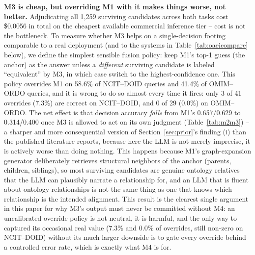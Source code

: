 \documentclass[conference]{IEEEtran}
\begin{document}
\textbf{M3 is cheap, but overriding M1 with it makes things worse, not better.} Adjudicating all 1{,}259 surviving candidates across both tasks cost \$0.0056 in total on the cheapest available commercial inference tier -- cost is not the bottleneck. To measure whether M3 helps on a single-decision footing comparable to a real deployment (and to the systems in Table~\ref{tab:oaeicompare} below), we define the simplest sensible fusion policy: keep M1's top-1 guess (the anchor) as the answer unless a \emph{different} surviving candidate is labeled ``equivalent'' by M3, in which case switch to the highest-confidence one. This policy overrides M1 on 58.6\% of NCIT--DOID queries and 41.4\% of OMIM--ORDO queries, and it is wrong to do so almost every time it fires: only 3 of 41 overrides (7.3\%) are correct on NCIT--DOID, and 0 of 29 (0.0\%) on OMIM--ORDO. The net effect is that decision accuracy \emph{falls} from M1's 0.657/0.629 to 0.314/0.400 once M3 is allowed to act on its own judgment (Table~\ref{tab:m2m3}) -- a sharper and more consequential version of Section~\ref{sec:prior}'s finding (i) than the published literature reports, because here the LLM is not merely imprecise, it is actively worse than doing nothing. This happens because M1's graph-expansion generator deliberately retrieves structural neighbors of the anchor (parents, children, siblings), so most surviving candidates are genuine ontology relatives that the LLM can plausibly narrate a relationship for, and an LLM that is fluent about ontology relationships is not the same thing as one that knows which relationship is the intended alignment. This result is the clearest single argument in this paper for why M3's output must never be committed without M4: an uncalibrated override policy is not neutral, it is harmful, and the only way to captured its occasional real value (7.3\% and 0.0\% of overrides, still non-zero on NCIT--DOID) without its much larger downside is to gate every override behind a controlled error rate, which is exactly what M4 is for.
\end{document}
